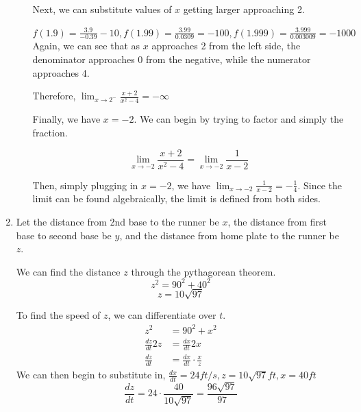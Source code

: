 \documentclass[11pt, letterpaper, twoside]{article}
\begin{document}
\begin{enumerate}
\begin{enumerate}[label=\alph*)]
Next, we can substitute values of \(x\) getting larger approaching 2.

\(f(1.9)=\frac{3.9}{-0.39}-10, f(1.99)=\frac{3.99}{0.0309}=-100, f(1.999)=\frac{3.999}{0.003009}=-1000\)\\

Again, we can see that as \(x\) approaches 2 from the left side, the denominator approaches 0 from the negative, while the numerator approaches 4.

Therefore, \(\lim_{x\to2^-}\frac{x+2}{x^2-4}=-\infty\)

Finally, we have \(x=-2\). We can begin by trying to factor and simply the fraction.

\[\lim_{x\to-2}\frac{x+2}{x^2-4}=\lim_{x\to-2}\frac{1}{x-2}\]

Then, simply plugging in \(x=-2\), we have \(\lim_{x\to-2}\frac{1}{x-2}=-\frac{1}{4}\). 
Since the limit can be found algebraically, the limit is defined from both sides.
\end{enumerate}
\item Let the distance from 2nd base to the runner be \(x\), the distance from first base to second base be \(y\), and the distance from home plate to the runner be \(z\).

We can find the distance \(z\) through the pythagorean theorem.
\[z^2=90^2+40^2\]
\[z=10\sqrt{97}\]

To find the speed of \(z\), we can differentiate over \(t\).
\begin{align*}
z^2&=90^2+x^2\\
\frac{dz}{dt}2z&=\frac{dx}{dt}2x\\
\frac{dz}{dt}&=\frac{dx}{dt}\cdot\frac{x}{z}
\end{align*}
We can then begin to substitute in, \(\frac{dx}{dt}=24ft/s, z=10\sqrt{97}ft, x=40ft\)
\[\frac{dz}{dt}=24\cdot\frac{40}{10\sqrt{97}}=\boxed{\frac{96\sqrt{97}}{97}}\]

\end{enumerate}
\end{document}
